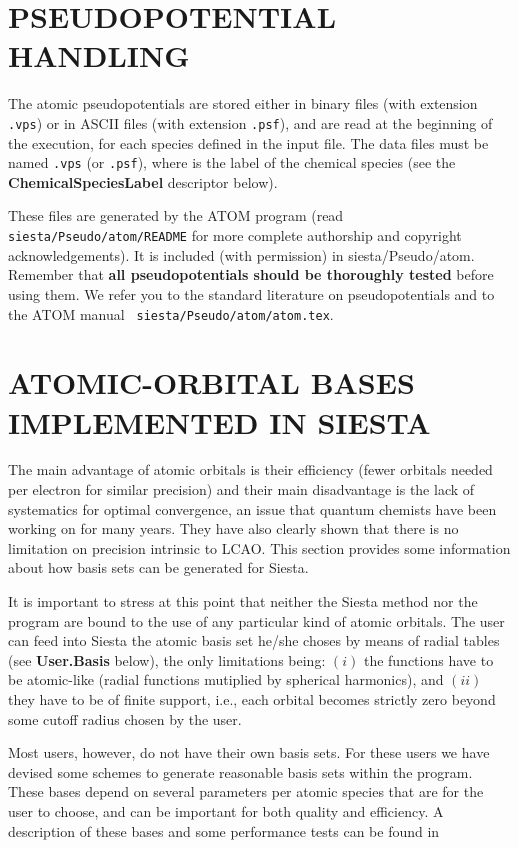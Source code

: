 \documentclass[11pt]{article}
\begin{document}
\section{PSEUDOPOTENTIAL HANDLING}


The atomic pseudopotentials are stored either in binary files (with
extension {\tt .vps}) or in ASCII files (with extension {\tt .psf}),
and are read at the beginning of the execution, for each species
defined in the input file. The data files must be named {\tt *.vps}
(or {\tt *.psf}), where {\tt *} is the label of the chemical species
(see the {\bf ChemicalSpeciesLabel} descriptor below).

These files are generated by the ATOM program (read {\tt
siesta/Pseudo/atom/README} for more complete authorship and copyright
acknowledgements).  It is included (with permission) in
siesta/Pseudo/atom. Remember that {\bf all pseudopotentials should be
thoroughly tested} before using them. We refer you to the standard
literature on pseudopotentials and to the {\sc ATOM} manual {\tt
siesta/Pseudo/atom/atom.tex}.


\section{ATOMIC-ORBITAL BASES IMPLEMENTED IN SIESTA}

The main advantage of atomic orbitals is their efficiency (fewer orbitals 
needed per electron for similar precision) 
and their main disadvantage is the lack of systematics for optimal 
convergence, an issue that quantum chemists have been working on for
many years. They have also clearly shown that there
is no limitation on precision intrinsic to LCAO.
This section provides some information about how basis sets can be
generated for {\sc Siesta}.

It is important to stress at this point that neither the {\sc Siesta} 
method nor the program
are bound to the use of any particular kind of atomic orbitals. The
user can feed into {\sc Siesta} the atomic basis set he/she choses by
means of radial tables (see {\bf User.Basis} below), the
only limitations being: $(i)$ the functions have to be atomic-like (radial 
functions mutiplied by spherical harmonics), and $(ii)$ they have to be
of finite support, i.e., each orbital becomes strictly zero beyond some
cutoff radius chosen by the user.

Most users, however, do not have their own basis sets. For these users
we have devised some schemes to generate reasonable basis sets within
the program. These bases depend on several parameters per atomic
species that are for the user to choose, and can be important for both
quality and efficiency. A description of these bases and some
performance tests can be found in
\end{document}
